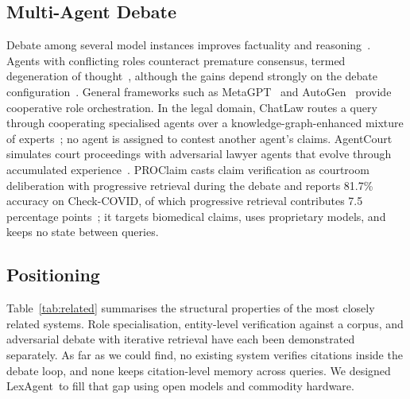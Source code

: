\documentclass[conference]{IEEEtran}
\newcommand{\sys}{LexAgent}
\begin{document}
\subsection{Multi-Agent Debate}
Debate among several model instances improves factuality and reasoning~\cite{du2024}. Agents with conflicting roles counteract premature consensus, termed degeneration of thought~\cite{liang2024}, although the gains depend strongly on the debate configuration~\cite{smit2024}. General frameworks such as MetaGPT~\cite{metagpt} and AutoGen~\cite{autogen} provide cooperative role orchestration. In the legal domain, ChatLaw routes a query through cooperating specialised agents over a knowledge-graph-enhanced mixture of experts~\cite{chatlaw}; no agent is assigned to contest another agent's claims. AgentCourt simulates court proceedings with adversarial lawyer agents that evolve through accumulated experience~\cite{agentcourt}. PROClaim casts claim verification as courtroom deliberation with progressive retrieval during the debate and reports 81.7\% accuracy on Check-COVID, of which progressive retrieval contributes 7.5 percentage points~\cite{proclaim}; it targets biomedical claims, uses proprietary models, and keeps no state between queries.

\subsection{Positioning}
Table~\ref{tab:related} summarises the structural properties of the most closely related systems. Role specialisation, entity-level verification against a corpus, and adversarial debate with iterative retrieval have each been demonstrated separately. As far as we could find, no existing system verifies citations inside the debate loop, and none keeps citation-level memory across queries. We designed \sys\ to fill that gap using open models and commodity hardware.
\end{document}
